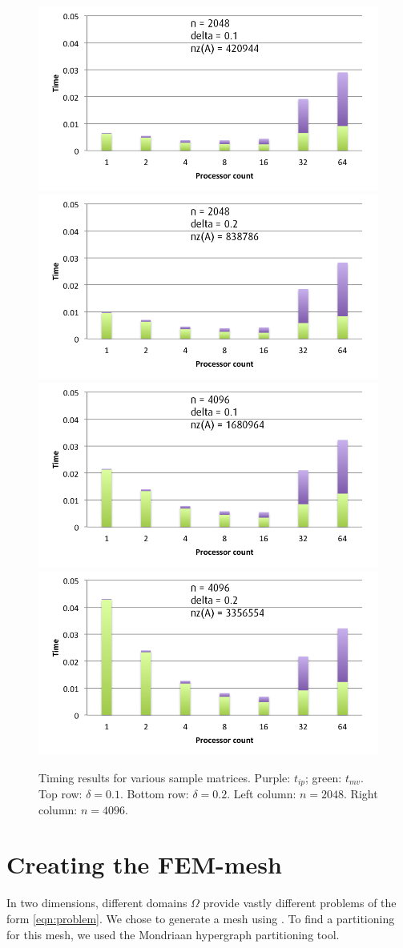 \documentclass[11pt]{amsart}
\theoremstyle{definition}
\begin{document}
\begin{figure}
  \includegraphics[width=0.48\linewidth]{n2048d0_1mvip.png}
  \includegraphics[width=0.48\linewidth]{n2048d0_2mvip.png}
  \includegraphics[width=0.48\linewidth]{n4096d0_1mvip.png}
  \includegraphics[width=0.48\linewidth]{n4096d0_2mvip.png}
  \caption{Timing results for various sample matrices. Purple: $t_{ip}$; green: $t_{mv}$. Top row: $\delta = 0.1$. Bottom row: $\delta = 0.2$. Left column: $n = 2048$. Right column: $n = 4096$.}
  \label{fig:samples}
\end{figure}

\section{Creating the FEM-mesh}
In two dimensions, different domains $\Omega$ provide vastly different problems of the form \eqref{eqn:problem}. We chose to generate a mesh using \cite{TODOJAN}. To find a partitioning for this mesh, we used the Mondriaan hypergraph partitioning tool.
\end{document}
